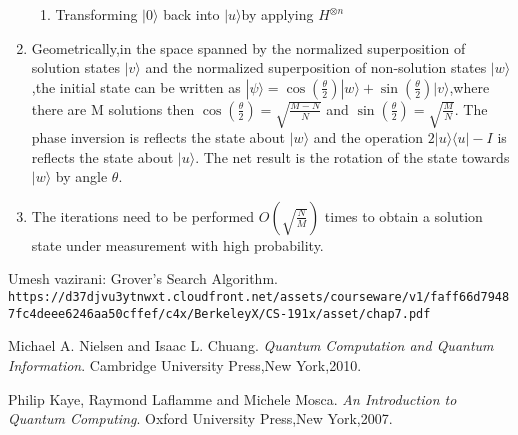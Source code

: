 \documentclass[a4,12pt]{article}
\begin{document}
\begin{enumerate}
\begin{enumerate}
	\item Transforming $|0\rangle$ back into $|u\rangle$by applying $H^{\otimes n}$	
\end{enumerate}
\item Geometrically,in the space spanned by the normalized superposition of solution states $|v\rangle$ and the normalized superposition of non-solution states $|w\rangle$,the initial state can be written as $ |\psi\rangle = \cos({\frac{\theta}{2}})|w\rangle + \sin({\frac{\theta}{2}})|v\rangle$,where there are M solutions then 
$\cos({\frac{\theta}{2}}) = \sqrt{\frac{M-N}{N}}$ and $\sin({\frac{\theta}{2}}) = \sqrt{\frac{M}{N}}$. The phase inversion is reflects the state about $|w\rangle$ and the operation $2|u\rangle \langle u|-I$ is reflects the state about $|u\rangle$. The net result is the rotation of the state towards $|w\rangle$ by angle $\theta$. 
\item The iterations need to be performed $O(\sqrt{\frac{N}{M}})$ times to obtain a solution state under measurement with high probability.
\end{enumerate}

\begin{thebibliography}{9}
	
	\bibitem{} 
	Umesh vazirani: Grover's Search Algorithm.
	\\\texttt{https://d37djvu3ytnwxt.cloudfront.net/assets/courseware/v1/faff66d79487fc4deee6246aa50cffef/c4x/BerkeleyX/CS-191x/asset/chap7.pdf}
	
	\bibitem{} 
	Michael A. Nielsen and Isaac L. Chuang. 
	\textit{Quantum Computation and Quantum Information}. 
	Cambridge University Press,New York,2010.
	
	\bibitem{} 
	Philip Kaye, Raymond Laflamme and Michele Mosca. 
	\textit{An Introduction to Quantum Computing}. 
	Oxford University Press,New York,2007.
	
\end{thebibliography}
\end{document}

